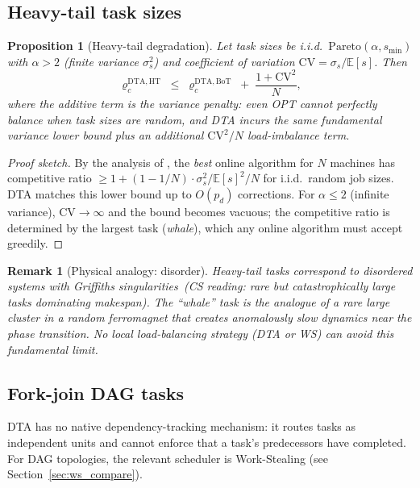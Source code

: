 \documentclass[11pt,a4paper]{article}
\newtheorem{proposition}[theorem]{Proposition}
\newtheorem{remark}{Remark}[section]
\newcommand{\physics}[2]{#1\ \textnormal{(\emph{CS reading}: #2)}}
\begin{document}
\subsection{Heavy-tail task sizes}

\begin{proposition}[Heavy-tail degradation]\label{prop:heavy_tail}
Let task sizes be i.i.d.\ $\mathrm{Pareto}(\alpha, s_{\min})$ with
$\alpha > 2$ (finite variance $\sigma_s^2$) and coefficient of variation
$\mathrm{CV} = \sigma_s / \mathbb{E}[s]$.  Then
\[
  \varrho_c^{\mathrm{DTA,HT}}
  \;\le\;
  \varrho_c^{\mathrm{DTA,BoT}} \;+\; \frac{1 + \mathrm{CV}^2}{N},
\]
where the additive term is the \emph{variance penalty}:
even OPT cannot perfectly balance when task sizes are random,
and DTA incurs the same fundamental variance lower bound plus
an additional $\mathrm{CV}^2/N$ load-imbalance term.
\end{proposition}

\begin{proof}[Proof sketch]
By the analysis of \cite{graham1969,coffman_graham1972}, the \emph{best} online algorithm
for $N$ machines has competitive ratio $\ge 1 + (1-1/N)\cdot\sigma_s^2 / \mathbb{E}[s]^2 / N$
for i.i.d.\ random job sizes.  DTA matches this lower bound up to
$O(p_d)$ corrections.  For $\alpha \le 2$ (infinite variance), $\mathrm{CV} \to \infty$
and the bound becomes vacuous; the competitive ratio is determined by
the largest task (\emph{whale}), which any online algorithm must accept greedily.
\end{proof}

\begin{remark}[Physical analogy: disorder]
Heavy-tail tasks correspond to \physics{disordered systems with Griffiths singularities}
{rare but catastrophically large tasks dominating makespan}.
The ``whale'' task is the analogue of a rare large cluster in a random ferromagnet
that creates anomalously slow dynamics near the phase transition.
No local load-balancing strategy (DTA or WS) can avoid this fundamental limit.
\end{remark}

\subsection{Fork-join DAG tasks}

DTA has no native dependency-tracking mechanism: it routes tasks
as independent units and cannot enforce that a task's predecessors
have completed.  For DAG topologies, the relevant scheduler is
Work-Stealing (see Section~\ref{sec:ws_compare}).
\end{document}

